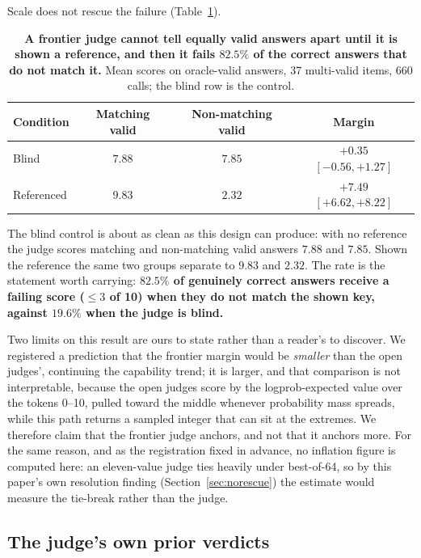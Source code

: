 \documentclass[11pt]{article}
\begin{document}
Scale does not rescue the failure (Table~\ref{tab:frontier2}).

\begin{table}[tbp]
\centering
\small
\setlength{\tabcolsep}{7pt}
\begin{tabular}{lccc}
\toprule
Condition & Matching valid & Non-matching valid & Margin \\
\midrule
Blind & $7.88$ & $7.85$ & $+0.35$ {\scriptsize$[-0.56, +1.27]$} \\
Referenced & $9.83$ & $\mathbf{2.32}$ & $\mathbf{+7.49}$ {\scriptsize$[+6.62, +8.22]$} \\
\bottomrule
\end{tabular}
\caption{\textbf{A frontier judge cannot tell equally valid answers apart until it is shown a reference, and then it fails $82.5\%$ of the correct answers that do not match it.} Mean scores on oracle-valid answers, 37 multi-valid items, 660 calls; the blind row is the control.}
\label{tab:frontier2}
\end{table}

The blind control is about as clean as this design can produce: with no reference the judge scores matching and non-matching valid answers $7.88$ and $7.85$.
Shown the reference the same two groups separate to $9.83$ and $2.32$.
The rate is the statement worth carrying: \textbf{$82.5\%$ of genuinely correct answers receive a failing score ($\leq 3$ of 10) when they do not match the shown key, against $19.6\%$ when the judge is blind.}

Two limits on this result are ours to state rather than a reader's to discover.
We registered a prediction that the frontier margin would be \emph{smaller} than the open judges', continuing the capability trend; it is larger, and that comparison is not interpretable, because the open judges score by the logprob-expected value over the tokens 0--10, pulled toward the middle whenever probability mass spreads, while this path returns a sampled integer that can sit at the extremes.
We therefore claim that the frontier judge anchors, and not that it anchors more.
For the same reason, and as the registration fixed in advance, no inflation figure is computed here: an eleven-value judge ties heavily under best-of-64, so by this paper's own resolution finding (Section~\ref{sec:norescue}) the estimate would measure the tie-break rather than the judge.

\subsection{The judge's own prior verdicts}
\label{sec:aw}
\end{document}
